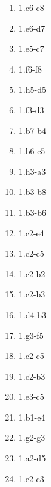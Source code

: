 \begin{enumerate}
\setcounter{enumi}{\value{d_counter}}
\item 1.\rook{}c6-c8\mate{}
\item 1.\queen{}e6-d7\mate{}
\item 1.\queen{}e5-c7\mate{}
\item 1.\queen{}f6-f8\mate{}
\item 1.\rook{}h5-d5\mate{}
\item 1.\queen{}f3-d3\mate{}
\item 1.\queen{}b7-b4\mate{}
\item 1.\queen{}b6-c5\mate{}
\item 1.\rook{}h3-a3\mate{}
\item 1.\rook{}b3-b8\mate{}
\item 1.\rook{}b3-b6\mate{}
\item 1.\queen{}c2-e4\mate{}
\item 1.\queen{}c2-c5\mate{}
\item 1.\queen{}c2-b2\mate{}
\item 1.\queen{}c2-b3\mate{}
\item 1.\knight{}d4-b3\mate{}
\item 1.\knight{}g3-f5\mate{}
\item 1.\queen{}c2-c5\mate{}
\item 1.\queen{}c2-b3\mate{}
\item 1.\bishop{}e3-c5\mate{}
\item 1.\queen{}b1-e4\mate{}
\item 1.\pawn{}g2-g3\mate{}
\item 1.\bishop{}a2-d5\mate{}
\item 1.\knight{}e2-c3\mate{}
\setcounter{d_counter}{\value{enumi}}
\end{enumerate}